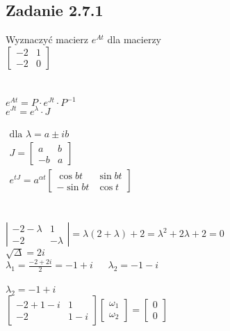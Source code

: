 \subsection*{Zadanie 2.7.1} {\color{darkgray}
	Wyznaczyć macierz $e^{At}$ dla macierzy\\
	$\left[\begin{array}{cc}-2&1\\-2&0\end{array}\right]$\\
}\lineh
\\\\
$e^{At}=P\cdot e^{Jt}\cdot P^{-1}$\\
$e^{Jt}=e^\lambda \cdot J$\\\\
$\boxed{\begin{aligned}
\text{dla }\lambda=a \pm ib\\
J=\left[\begin{array}{cc}a&b\\-b&a\end{array}\right]\\
e^{tJ}=a^{\alpha t}\left[\begin{array}{cc}\cos bt&\sin bt\\-\sin bt& \cos t\end{array}\right]
\end{aligned}}$\\\\\\
$\left|\begin{array}{cc}-2-\lambda&1\\-2&-\lambda\end{array}\right|=\lambda(2+\lambda)+2=\lambda^2+2\lambda+2=0$\\
$\sqrt{\Delta}=2i$\\
$\lambda_1=\frac{-2+2i}{2}=-1+i \ \ \ \ \ \ \ \lambda_2=-1-i$\\
\\
$\boxed{ \lambda_2=-1+i}$\\
$\left[\begin{array}{cc}-2+1-i&1\\-2&1-i\end{array}\right]\left[\begin{array}{c}\omega_1\\ \omega_2\end{array}\right]=\left[\begin{array}{c}0\\0\end{array}\right]$\\
